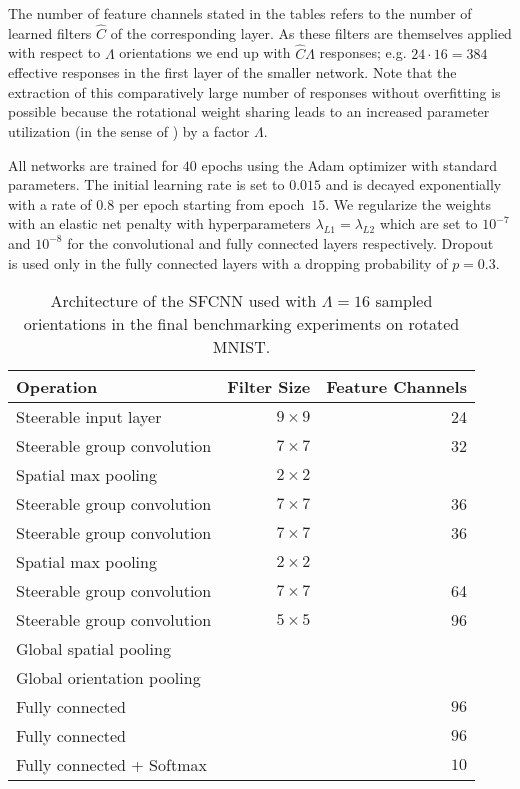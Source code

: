 \documentclass[10pt,twocolumn,letterpaper]{article}
\begin{document}
The number of feature channels stated in the tables refers to the number of learned filters $\hat{C}$ of the corresponding layer.
As these filters are themselves applied with respect to $\Lambda$ orientations we end up with $\hat{C}\Lambda$ responses; e.g. $24\cdot16=384$ effective responses in the first layer of the smaller network.
Note that the extraction of this comparatively large number of responses without overfitting is possible because the rotational weight sharing leads to an increased parameter utilization (in the sense of \citet{cohen2016steerable}) by a factor $\Lambda$.

All networks are trained for $40$ epochs using the Adam optimizer \citep{kingma2015adam} with standard parameters.
The initial learning rate is set to $0.015$ and is decayed exponentially with a rate of $0.8$ per epoch starting from epoch~$15.$
We regularize the weights with an elastic net penalty with hyperparameters $\lambda_{L1}=\lambda_{L2}$ which are set to $10^{-7}$ and $10^{-8}$ for the convolutional and fully connected layers respectively.
Dropout~\citep{srivastava2014dropout} is used only in the fully connected layers with a dropping probability of $p=0.3$.

\begin{table}[t]
	\centering
	\small
	\begin{tabular}{lrr}
		\toprule
		Operation & Filter Size & Feature Channels \\
		\toprule
		Steerable input layer  & $9\times 9$ &  24 \\
		Steerable group convolution  & $7\times 7$ &  32 \\
		Spatial max pooling & $2 \times 2$ & \\
		\midrule
		Steerable group convolution  & $7\times 7$ &  36 \\
		Steerable group convolution  & $7\times 7$ &  36 \\
		Spatial max pooling & $2 \times 2$ & \\
		\midrule
		Steerable group convolution  & $7\times 7$ &  64 \\
		Steerable group convolution  & $5\times 5$ &  96 \\
		Global spatial pooling \\
		Global orientation pooling \\
		\midrule
		Fully connected  & & $96$ \\
		Fully connected  & & $96$ \\
		Fully connected + Softmax  & & $10$ \\
		\bottomrule
	\end{tabular}
	\caption{Architecture of the SFCNN used with $\Lambda=16$ sampled orientations in the final benchmarking experiments on rotated MNIST.}
	\label{tab:architectureCNN2}
\end{table}
\end{document}
